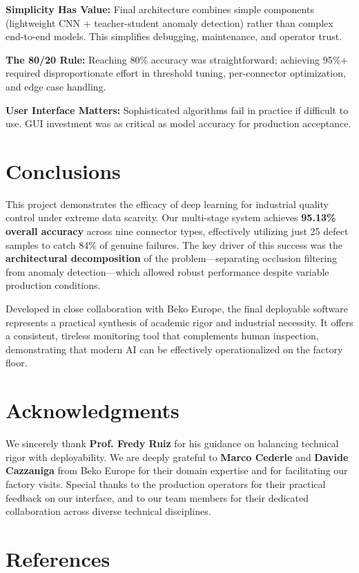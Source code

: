 \documentclass[11pt,a4paper,draft]{article}
\begin{document}
\noindent \textbf{Simplicity Has Value:} Final architecture combines simple components (lightweight CNN + teacher-student anomaly detection) rather than complex end-to-end models. This simplifies debugging, maintenance, and operator trust.

\noindent \textbf{The 80/20 Rule:} Reaching 80\% accuracy was straightforward; achieving 95\%+ required disproportionate effort in threshold tuning, per-connector optimization, and edge case handling.

\noindent \textbf{User Interface Matters:} Sophisticated algorithms fail in practice if difficult to use. GUI investment was as critical as model accuracy for production acceptance.

\section{Conclusions}

This project demonstrates the efficacy of deep learning for industrial quality control under extreme data scarcity. Our multi-stage system achieves \textbf{95.13\% overall accuracy} across nine connector types, effectively utilizing just 25 defect samples to catch 84\% of genuine failures. The key driver of this success was the \textbf{architectural decomposition} of the problem—separating occlusion filtering from anomaly detection—which allowed robust performance despite variable production conditions.

Developed in close collaboration with Beko Europe, the final deployable software represents a practical synthesis of academic rigor and industrial necessity. It offers a consistent, tireless monitoring tool that complements human inspection, demonstrating that modern AI can be effectively operationalized on the factory floor.

\section{Acknowledgments}

We sincerely thank \textbf{Prof. Fredy Ruiz} for his guidance on balancing technical rigor with deployability. We are deeply grateful to \textbf{Marco Cederle} and \textbf{Davide Cazzaniga} from Beko Europe for their domain expertise and for facilitating our factory visits. Special thanks to the production operators for their practical feedback on our interface, and to our team members for their dedicated collaboration across diverse technical disciplines.
\section*{References}
\end{document}
